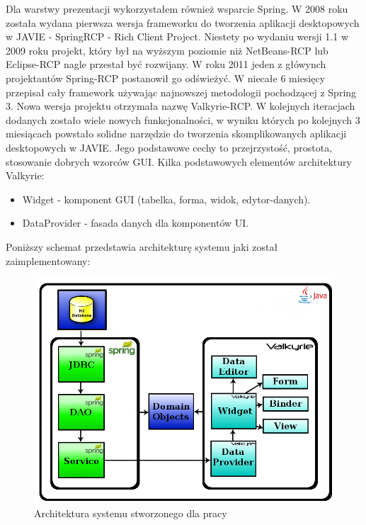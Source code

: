 Dla warstwy prezentacji wykorzystałem również wsparcie Spring. W 2008 roku została wydana pierwsza wersja frameworku do tworzenia aplikacji desktopowych w JAVIE - SpringRCP - Rich Client Project. Niestety po wydaniu wersji 1.1 w 2009 roku projekt, który był na wyższym poziomie niż NetBeans-RCP lub Eclipse-RCP nagle przestał być rozwijany. W roku 2011 jeden z główynch projektantów Spring-RCP postanowił go odświeżyć. W niecałe 6 miesięcy przepisał cały framework używając najnowszej metodologii pochodzącej z Spring 3. Nowa wersja projektu otrzymała nazwę Valkyrie-RCP. W kolejnych iteracjach dodanych zostało wiele nowych funkcjonalności, w wyniku których po kolejnych 3 miesiącach powstało solidne narzędzie do tworzenia skomplikowanych aplikacji desktopowych w JAVIE. Jego podstawowe cechy to przejrzystość, prostota, stosowanie dobrych wzorców GUI. Kilka podstawowych elementów architektury Valkyrie:
\begin{itemize}
 \item Widget - komponent GUI (tabelka, forma, widok, edytor-danych).
 \item DataProvider - fasada danych dla komponentów UI.
\end{itemize}

Poniższy schemat przedstawia architekturę systemu jaki został zaimplementowany:

\begin{figure}[!ht]
\label{img:rysunek_spring2}
\includegraphics[scale=0.4]{images/spring-layers2}
\caption[Rysunek przedstawiający model architektury systemu]{Architektura systemu stworzonego dla pracy}
\end{figure}

